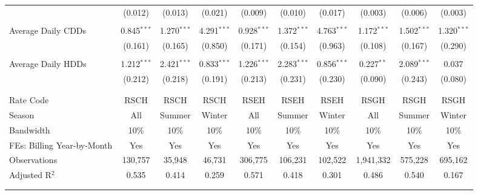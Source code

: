 {\begin{table}[t!]
\begin{adjustbox}{scale = 0.74}
\begin{threeparttable}
\begin{tabular}{@{\extracolsep{0pt}}lccccccccc}
                    & (0.012) & (0.013) & (0.021) & (0.009) & (0.010) & (0.017) & (0.003) & (0.006) & (0.003) \\ 
                    & & & & & & & & & \\ 
                    Average Daily CDDs & 0.845$^{***}$ & 1.270$^{***}$ & 4.291$^{***}$ & 0.928$^{***}$ & 1.372$^{***}$ & 4.763$^{***}$ & 1.172$^{***}$ & 1.502$^{***}$ & 1.320$^{***}$ \\ 
                    & (0.161) & (0.165) & (0.850) & (0.171) & (0.154) & (0.963) & (0.108) & (0.167) & (0.290) \\ 
                    & & & & & & & & & \\ 
                    Average Daily HDDs & 1.212$^{***}$ & 2.421$^{***}$ & 0.833$^{***}$ & 1.226$^{***}$ & 2.283$^{***}$ & 0.856$^{***}$ & 0.227$^{**}$ & 2.089$^{***}$ & 0.037 \\ 
                    & (0.212) & (0.218) & (0.191) & (0.213) & (0.231) & (0.230) & (0.090) & (0.243) & (0.080) \\ 
                    & & & & & & & & & \\
                    \hline
                    \\[-2.0ex]
                    Rate Code & RSCH & RSCH & RSCH & RSEH & RSEH & RSEH & RSGH & RSGH & RSGH \\ 
                    Season & All & Summer & Winter & All & Summer & Winter & All & Summer & Winter \\ 
                    Bandwidth & 10\% & 10\% & 10\% & 10\% & 10\% & 10\% & 10\% & 10\% & 10\% \\ 
                    FEs: Billing Year-by-Month & Yes & Yes & Yes & Yes & Yes & Yes & Yes & Yes & Yes \\ 
                    Observations & 130,757 & 35,948 & 46,731 & 306,775 & 106,231 & 102,522 & 1,941,332 & 575,228 & 695,162 \\ 
                    Adjusted R$^{2}$ & 0.535 & 0.414 & 0.259 & 0.571 & 0.418 & 0.301 & 0.486 & 0.540 & 0.167 \\
                    \\[-2.0ex]
                    \hline \hline
                    \\[-4.5ex]
                \end{tabular}
                \begin{tablenotes}[flushleft]
                    \footnotesize

\end{tablenotes}
\end{threeparttable}
\end{adjustbox}
\end{table}}

